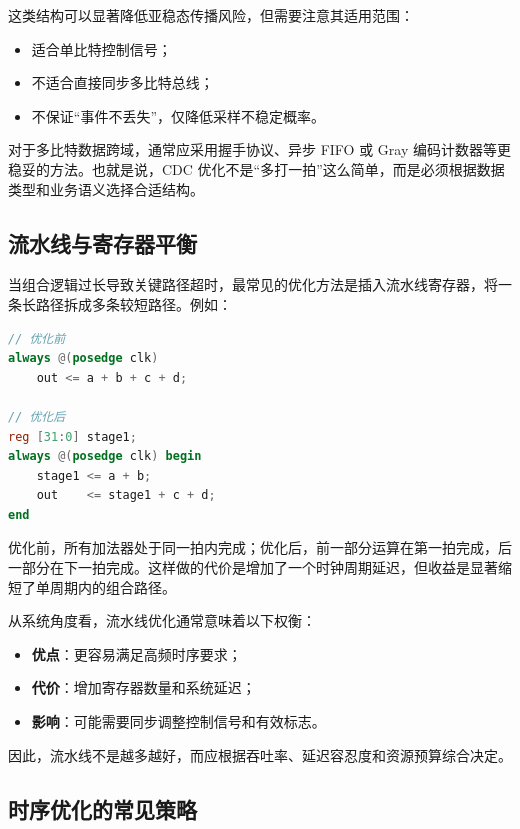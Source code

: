 这类结构可以显著降低亚稳态传播风险，但需要注意其适用范围：

\begin{itemize}
\tightlist
\item
  适合单比特控制信号；
\item
  不适合直接同步多比特总线；
\item
  不保证``事件不丢失''，仅降低采样不稳定概率。
\end{itemize}

对于多比特数据跨域，通常应采用握手协议、异步 FIFO 或 Gray
编码计数器等更稳妥的方法。也就是说，CDC
优化不是``多打一拍''这么简单，而是必须根据数据类型和业务语义选择合适结构。

\subsection{流水线与寄存器平衡}\label{ux6d41ux6c34ux7ebfux4e0eux5bc4ux5b58ux5668ux5e73ux8861}

当组合逻辑过长导致关键路径超时，最常见的优化方法是插入流水线寄存器，将一条长路径拆成多条较短路径。例如：

\begin{lstlisting}[language=Verilog]
// 优化前
always @(posedge clk)
    out <= a + b + c + d;

// 优化后
reg [31:0] stage1;
always @(posedge clk) begin
    stage1 <= a + b;
    out    <= stage1 + c + d;
end
\end{lstlisting}

优化前，所有加法器处于同一拍内完成；优化后，前一部分运算在第一拍完成，后一部分在下一拍完成。这样做的代价是增加了一个时钟周期延迟，但收益是显著缩短了单周期内的组合路径。

从系统角度看，流水线优化通常意味着以下权衡：

\begin{itemize}
\tightlist
\item
  \textbf{优点}：更容易满足高频时序要求；
\item
  \textbf{代价}：增加寄存器数量和系统延迟；
\item
  \textbf{影响}：可能需要同步调整控制信号和有效标志。
\end{itemize}

因此，流水线不是越多越好，而应根据吞吐率、延迟容忍度和资源预算综合决定。

\subsection{时序优化的常见策略}\label{ux65f6ux5e8fux4f18ux5316ux7684ux5e38ux89c1ux7b56ux7565}

